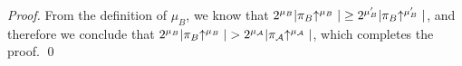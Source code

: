 \begin{proof}
    From the definition of $\mu_B$, we know that
    $2^{\mu_B}|\pi_B\negthickspace\uparrow^{\mu_B}| \geq 2^{\mu_B'}|\pi_B\negthickspace\uparrow^{\mu_B'}|$,
    and therefore we conclude that $2^{\mu_B}|\pi_B\negthickspace\uparrow^{\mu_B}| >
    2^{\mu_\mathcal{A}}|\pi_\mathcal{A}\negthickspace\uparrow^{\mu_\mathcal{A}}|$, which
    completes the proof.
    \qed
%
\end{proof}
